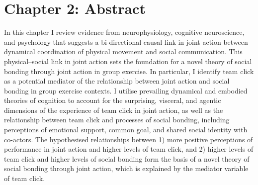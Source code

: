 \chapter*{Chapter 2: Abstract}



In this chapter I review evidence from neurophysiology, cognitive neuroscience, and psychology that suggests a bi-directional causal link in joint action between dynamical coordination of physical movement and social communication.  This physical--social link in joint action sets the foundation for a novel theory of social bonding through joint action in group exercise. In particular, I identify team click as a potential mediator of the relationship between joint action and social bonding in group exercise contexts.  I utilise prevailing dynamical and embodied theories of cognition to account for the surprising, visceral, and agentic dimensions of the experience of team click in joint action, as well as the relationship between team click and processes of social bonding, including perceptions of emotional support, common goal, and shared social identity with co-actors.  The hypothesised relationships between 1) more positive perceptions of performance in joint action and higher levels of team click, and 2) higher levels of team click and higher levels of social bonding form the basis of a novel theory of social bonding through joint action, which is explained by the mediator variable of team click.




